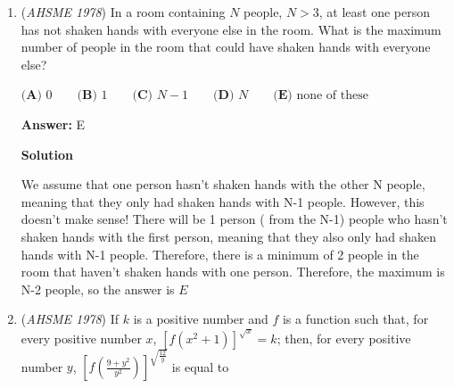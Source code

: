\begin{enumerate}
 $\textbf{(A) }-\frac{4}{3}\qquad \textbf{(B) }-\frac{3}{4}\qquad \textbf{(C) }\frac{3}{4}\qquad \textbf{(D) }\frac{4}{3}\qquad\\ \textbf{(E) }\text{not completely determined by the given information}$

 \textbf{Answer: }A



\textbf{Solution}

Squaring the equation, we get
 \[\sin ^2 x + \cos ^2 x + 2 \sin x \cos x = \frac{1}{25} =\Rrightarrow 2\sin x \cos x = -\frac{24}{25} \Rrightarrow \sin x \cos x = -\frac{12}{25}\]Recall that $(a-b)^2 = (a+b)^2 - 4ab$, so
 \[(\sin x - \cos x)^2 = (\sin x + \cos x)^2 - 4 \sin x \cos x\]
 \[(\sin x - \cos x)^2 = \frac{1}{25} - 4 (- \frac{12}{25})\]
 \[(\sin x - \cos x) = \frac{7}{5}\]We can now solve for the values of $\sin x$ and $\cos x$
 \[\sin x + \cos x = \frac{1}{5}\]
 \[\sin x - \cos x = \frac{7}{5}\]
 \[2 \sin x = \frac{8}{5} \Rrightarrow \sin x = \frac{4}{5}, \cos x = -\frac{3}{5}\]Since $\tan x = \frac{\sin x}{\cos x}$, we have
 \[\tan x = \frac{\frac{4}{5}}{-\frac{3}{5}} = -\frac{4}{3}\]$\boxed{A}$



	\item (\textit{AHSME 1978}) In a room containing $N$ people, $N > 3$, at least one person has not shaken hands with everyone else in the room. 
What is the maximum number of people in the room that could have shaken hands with everyone else?


 $\textbf{(A) }0\qquad \textbf{(B) }1\qquad \textbf{(C) }N-1\qquad \textbf{(D) }N\qquad  \textbf{(E) }\text{none of these}$

 \textbf{Answer: }E



\textbf{Solution}

We assume that one person hasn't shaken hands with the other N people, meaning that they only had shaken hands with N-1 people. However, this doesn't make sense! There will be 1 person ( from the N-1) people who hasn't shaken hands with the first person, meaning that they also only had shaken hands with N-1 people. Therefore, there is a minimum of 2 people in the room that haven't shaken hands with one person. Therefore, the maximum is N-2 people, so the answer is $E$



	\item (\textit{AHSME 1978}) If $k$ is a positive number and $f$ is a function such that, for every positive number $x$, $\left[f(x^2+1)\right]^{\sqrt{x}}=k$; 
then, for every positive number $y$, $\left[f(\frac{9+y^2}{y^2})\right]^{\sqrt{\frac{12}{y}}}$ is equal to



\end{enumerate}
